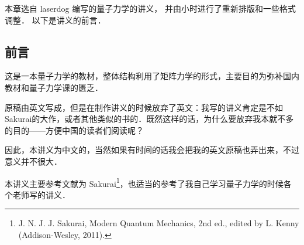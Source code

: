 
本章选自 laserdog 编写的量子力学的讲义，%
并由小时进行了重新排版和一些格式调整． 以下是讲义的前言．

\subsection{前言}

这是一本量子力学的教材，整体结构利用了矩阵力学的形式，主要目的为弥补国内教材和量子力学课的匮乏．

原稿由英文写成，但是在制作讲义的时候放弃了英文：我写的讲义肯定是不如Sakurai的大作，或者其他类似的书的．既然这样的话，为什么要放弃我本就不多的目的——方便中国的读者们阅读呢？

因此，本讲义为中文的，当然如果有时间的话我会把我的英文原稿也弄出来，不过意义并不很大．

本讲义主要参考文献为 Sakurai\footnote{J. N. J. J. Sakurai, Modern Quantum Mechanics, 2nd ed., edited by L. Kenny (Addison-Wesley, 2011).}，也适当的参考了我自己学习量子力学的时候各个老师写的讲义．
